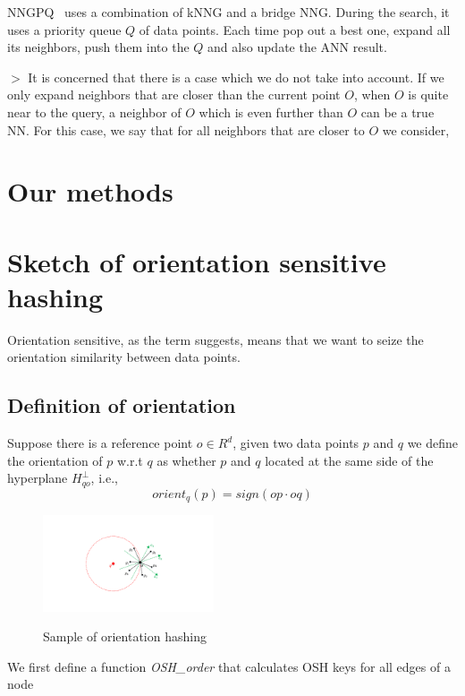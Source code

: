 \documentclass{article} %
\begin{document}
NNGPQ~\cite{WangJDNNGPQ2013} uses a combination of kNNG and a bridge NNG. During the search, it uses a priority queue $Q$ of data points. Each time pop out a best one, expand all its neighbors, push them into the $Q$ and also update the ANN result.

$>$ It is concerned that there is a case which we do not take into account. If we only expand neighbors that are closer than the current point $O$, when $O$ is quite near to the query, a neighbor of $O$ which is even further than $O$ can be a true NN. For this case, we say that for all neighbors that are closer to $O$ we consider, 


\section{Our methods}
\section{Sketch of orientation sensitive hashing}\label{osh}

Orientation sensitive, as the term suggests, means that we want to seize the orientation similarity between data points.

\subsection{Definition of orientation}
Suppose there is a reference point $o \in R^d$, given two data points $p$ and $q$ we define the orientation of $p$ w.r.t $q$ as whether $p$ and $q$ located at the same side of the hyperplane $H_{qo}^{\bot}$, i.e.,
\begin{equation}
orient_q(p)=sign(op\cdot oq)
\end{equation}

\begin{figure}
	\centering
	\includegraphics[width=0.45\textwidth]{OSH.pdf}\\
	\caption{Sample of orientation hashing}\label{fig:nncompare}
\end{figure}


We first define a function \textit{OSH\_order} that calculates OSH keys for all edges of a node 
\end{document}
